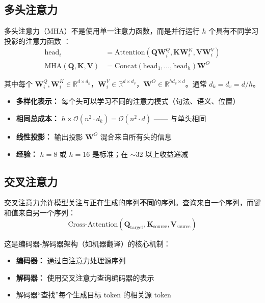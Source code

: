 \subsection{多头注意力}

多头注意力（MHA）不是使用单一注意力函数，而是并行运行 $h$ 个具有不同学习投影的注意力函数 \cite{vaswani2017attention}：
\begin{align}
\text{head}_i &= \text{Attention}(\mathbf{Q}\mathbf{W}_i^Q, \mathbf{K}\mathbf{W}_i^K, \mathbf{V}\mathbf{W}_i^V) \\
\text{MHA}(\mathbf{Q}, \mathbf{K}, \mathbf{V}) &= \text{Concat}(\text{head}_1, \ldots, \text{head}_h)\mathbf{W}^O
\end{align}

其中每个 $\mathbf{W}_i^Q, \mathbf{W}_i^K \in \mathbb{R}^{d \times d_k}$，$\mathbf{W}_i^V \in \mathbb{R}^{d \times d_v}$，$\mathbf{W}^O \in \mathbb{R}^{hd_v \times d}$。通常 $d_k = d_v = d/h$。

\begin{properties}[为什么要用多个头？]
\begin{itemize}
    \item \textbf{多样化表示：} 每个头可以学习不同的注意力模式（句法、语义、位置）
    \item \textbf{相同总成本：} $h \times \mathcal{O}(n^2 \cdot d_k) = \mathcal{O}(n^2 \cdot d)$ —— 与单头相同
    \item \textbf{线性投影：} 输出投影 $\mathbf{W}^O$ 混合来自所有头的信息
    \item \textbf{经验：} $h = 8$ 或 $h = 16$ 是标准；在 $\sim$32 以上收益递减
\end{itemize}
\end{properties}

\subsection{交叉注意力}

交叉注意力允许模型关注与正在生成的序列\textbf{不同}的序列。查询来自一个序列，而键和值来自另一个序列：
\begin{equation}
\text{Cross-Attention}(\mathbf{Q}_{\text{target}}, \mathbf{K}_{\text{source}}, \mathbf{V}_{\text{source}})
\end{equation}

这是编码器-解码器架构（如机器翻译）的核心机制：
\begin{itemize}
    \item \textbf{编码器：} 通过自注意力处理源序列
    \item \textbf{解码器：} 使用交叉注意力查询编码器的表示
    \item 解码器``查找''每个生成目标 token 的相关源 token
\end{itemize}


